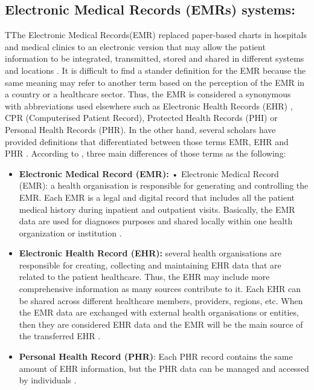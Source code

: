 \subsection{Electronic Medical Records (EMRs) systems:}

TThe Electronic Medical Records(EMR) replaced paper-based charts in hospitals and medical clinics to an electronic version that may allow the patient information to be integrated, transmitted, stored and shared in different systems and locations  \cite{Rahim2016}. It is difficult to find a stander definition for the EMR because the same meaning may refer to another term based on the perception of the EMR in a country or a healthcare sector. Thus, the EMR is considered a synonymous with abbreviations used elsewhere such as Electronic Health Records (EHR) \cite{WorldHealthOrganization2016,Rahim2016}, CPR (Computerised Patient Record), Protected Health Records (PHI) or Personal Health Records (PHR). In the other hand, several scholars have provided definitions that differentiated between those terms EMR, EHR and PHR \cite{Kierkegaard2011,Deutsch2010} . According to \cite{Yang2015,U.S.DepartmentofHealthandHumanServices2015}, three main differences of those terms as the following:
\begin{itemize}
	\item\textbf{ Electronic Medical Record (EMR):} •	Electronic Medical Record (EMR): a health organisation is responsible for generating and controlling the EMR. Each EMR is a legal and digital record that includes all the patient medical history during inpatient and outpatient visits. Basically, the EMR data are used for diagnoses purposes and shared locally within one health organization or institution \cite{Yang2015}. 
	\item \textbf{Electronic Health Record (EHR):} several health organisations are responsible for creating, collecting and maintaining EHR data that are related to the patient healthcare. Thus, the EHR may include more comprehensive information as many sources contribute to it. Each EHR can be shared across different healthcare members, providers, regions, etc. 
	When the EMR data are exchanged with external health organisations or entities, then they are considered EHR data and the EMR will be the main source of the transferred EHR \cite{Yang2015}.  
	\item \textbf{Personal Health Record (PHR)}: Each PHR record contains the same amount of EHR information, but the PHR data can be managed and accessed by individuals \cite{Yang2015,U.S.DepartmentofHealthandHumanServices2015}.
\end{itemize}

